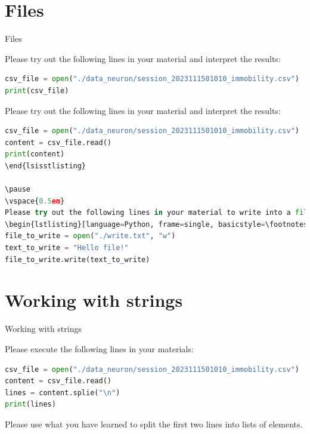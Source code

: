 \documentclass[aspectratio=169]{beamer}
\begin{document}
\section{Files}
\begin{frame}[fragile]{Files}

Please try out the following lines in your material and interpret the results:

\begin{lstlisting}[language=Python, frame=single, basicstyle=\footnotesize]
csv_file = open("./data_neuron/session_2023111501010_immobility.csv")
print(csv_file)
\end{lstlisting}

\pause
\vspace{0.5em}
Please try out the following lines in your material and interpret the results:

\begin{lstlisting}[language=Python, frame=single, basicstyle=\footnotesize]
csv_file = open("./data_neuron/session_2023111501010_immobility.csv")
content = csv_file.read()
print(content)
\end{lsisstlisting}

\pause
\vspace{0.5em}
Please try out the following lines in your material to write into a file:
\begin{lstlisting}[language=Python, frame=single, basicstyle=\footnotesize]
file_to_write = open("./write.txt", "w")
text_to_write = "Hello file!"
file_to_write.write(text_to_write)
\end{lstlisting}

\end{frame}

\section{Working with strings}
\begin{frame}[fragile]{Working with strings}

Please execute the following lines in your materials:

\begin{lstlisting}[language=Python, frame=single, basicstyle=\footnotesize]
csv_file = open("./data_neuron/session_2023111501010_immobility.csv")
content = csv_file.read()
lines = content.splie("\n")
print(lines)
\end{lstlisting}

\pause
\vspace{2em}
Please use what you have learned to split the first two lines into lists of elements.

\end{frame}
\end{document}
